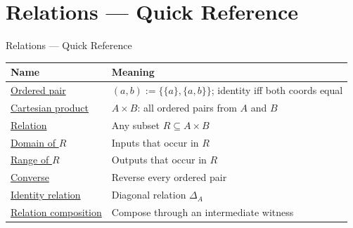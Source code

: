\section{Relations --- Quick Reference}


\begin{toolkitbox}{Relations --- Quick Reference}
\small
\begin{tabular}{l l}
\toprule
\textbf{Name}  & \textbf{Meaning} \\
\midrule
\hyperref[def:ordered-pair]{Ordered pair}      & $(a,b) := \{\{a\},\{a,b\}\}$; identity iff both coords equal  \\
\hyperref[def:cartesian-product-rel]{Cartesian product}  & $A \times B$: all ordered pairs from $A$ and $B$             \\
\hyperref[def:relation]{Relation}          & Any subset $R \subseteq A \times B$                           \\
\hyperref[def:relation-domain]{Domain of $R$}     & Inputs that occur in $R$                                      \\
\hyperref[def:relation-range]{Range of $R$}      & Outputs that occur in $R$                                     \\
\hyperref[def:converse-relation]{Converse}          & Reverse every ordered pair                                    \\
\hyperref[def:relation-identity]{Identity relation}  & Diagonal relation $\Delta_A$                                 \\
\hyperref[def:relation-composition]{Relation composition}  & Compose through an intermediate witness                  \\
\bottomrule
\end{tabular}
\end{toolkitbox}


